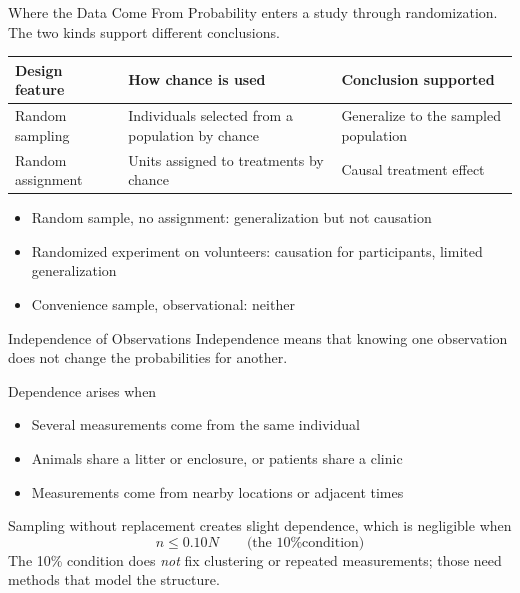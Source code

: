 \documentclass[aspectratio=169]{beamer}
\begin{document}
\begin{frame}{Where the Data Come From}
Probability enters a study through randomization. The two kinds support different conclusions.
\begin{center}
\begin{tabularx}{0.94\textwidth}{>{\RaggedRight\arraybackslash}p{} X X}
\toprule
\textbf{Design feature} & \textbf{How chance is used} & \textbf{Conclusion supported} \\
\midrule
Random sampling & Individuals selected from a population by chance & Generalize to the sampled population \\
Random assignment & Units assigned to treatments by chance & Causal treatment effect \\
\bottomrule
\end{tabularx}
\end{center}
\begin{itemize}
  \item Random sample, no assignment: generalization but not causation
  \item Randomized experiment on volunteers: causation for participants, limited generalization
  \item Convenience sample, observational: neither
\end{itemize}
\end{frame}

\begin{frame}{Independence of Observations}
Independence means that knowing one observation does not change the probabilities for another.

\vspace{0.2cm}
Dependence arises when
\begin{itemize}
  \item Several measurements come from the same individual
  \item Animals share a litter or enclosure, or patients share a clinic
  \item Measurements come from nearby locations or adjacent times
\end{itemize}

\vspace{0.2cm}
Sampling without replacement creates slight dependence, which is negligible when
$$n\le0.10N \qquad \text{(the 10\% condition)}$$
The 10\% condition does \emph{not} fix clustering or repeated measurements; those need methods that model the structure.
\end{frame}
\end{document}
